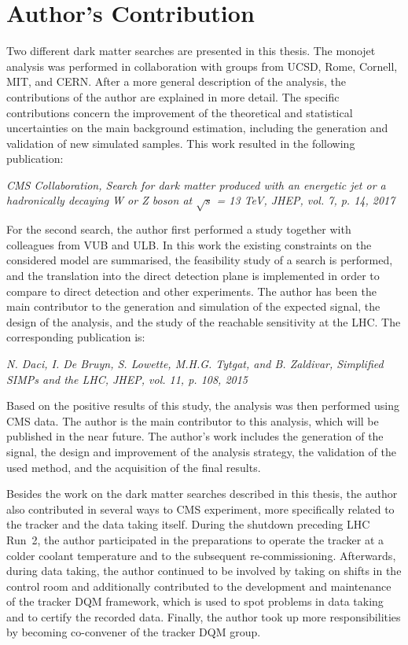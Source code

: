 \chapter*{Author's Contribution}

Two different dark matter searches are presented in this thesis. The monojet analysis was performed in collaboration with groups from UCSD, Rome, Cornell, MIT, and CERN. After a more general description of the analysis, the contributions of the author are explained in more detail. The specific contributions concern the improvement of the theoretical and statistical uncertainties on the main background estimation, including the generation and validation of new simulated samples. This work resulted in the following publication:

\begin{center}
\textit{CMS Collaboration, Search for dark matter produced with an energetic jet or a hadronically decaying W or Z boson at $\sqrt{s}$ = 13 TeV, JHEP, vol. 7, p. 14, 2017}
\end{center}

For the second search, the author first performed a study together with colleagues from VUB and ULB. In this work the existing constraints on the considered model are summarised, the feasibility study of a search is performed, and the translation into the direct detection plane is implemented in order to compare to direct detection and other experiments. The author has been the main contributor to the generation and simulation of the expected signal, the design of the analysis, and the study of the reachable sensitivity at the \acs{LHC}. The corresponding publication is:

\begin{center}
\textit{N. Daci, I. De Bruyn, S. Lowette, M.H.G. Tytgat, and B. Zaldivar, Simplified SIMPs and the LHC, JHEP, vol. 11, p. 108, 2015}
\end{center}

Based on the positive results of this study, the analysis was then performed using CMS data. The author is the main contributor to this analysis, which will be published in the near future. The author's work includes the generation of the signal, the design and improvement of the analysis strategy, the validation of the used method, and the acquisition of the final results.

\vspace{.5cm}

Besides the work on the dark matter searches described in this thesis, the author also contributed in several ways to \acs{CMS} experiment, more specifically related to the tracker and the data taking itself. During the shutdown preceding \acs{LHC} Run~2, the author participated in the preparations to operate the tracker at a colder coolant temperature and to the subsequent re-commissioning. Afterwards, during data taking, the author continued to be involved by taking on shifts in the control room and additionally contributed to the development and maintenance of the tracker \acf{DQM} framework, which is used to spot problems in data taking and to certify the recorded data. Finally, the author took up more responsibilities by becoming co-convener of the tracker \acs{DQM} group.